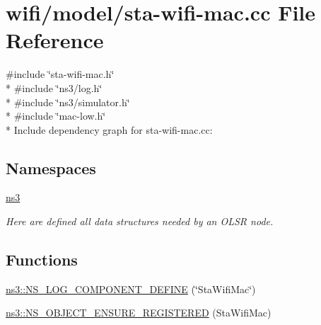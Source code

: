 \hypertarget{sta-wifi-mac_8cc}{}\section{wifi/model/sta-\/wifi-\/mac.cc File Reference}
\label{sta-wifi-mac_8cc}
{\ttfamily \#include \char`\"{}sta-\/wifi-\/mac.\+h\char`\"{}}\\*
{\ttfamily \#include \char`\"{}ns3/log.\+h\char`\"{}}\\*
{\ttfamily \#include \char`\"{}ns3/simulator.\+h\char`\"{}}\\*
{\ttfamily \#include \char`\"{}mac-\/low.\+h\char`\"{}}\\*
Include dependency graph for sta-\/wifi-\/mac.cc\+:
\subsection*{Namespaces}
\begin{DoxyCompactItemize}
\item 
 \hyperlink{namespacens3}{ns3}
\begin{DoxyCompactList}\small\item\em Here are defined all data structures needed by an O\+L\+SR node. \end{DoxyCompactList}\end{DoxyCompactItemize}
\subsection*{Functions}
\begin{DoxyCompactItemize}
\item 
\hyperlink{namespacens3_a395cfa6d9eb222df226e2ceea76418bd}{ns3\+::\+N\+S\+\_\+\+L\+O\+G\+\_\+\+C\+O\+M\+P\+O\+N\+E\+N\+T\+\_\+\+D\+E\+F\+I\+NE} (\char`\"{}Sta\+Wifi\+Mac\char`\"{})
\item 
\hyperlink{namespacens3_ac9b82f5e7e9e909afe93289fd667ea84}{ns3\+::\+N\+S\+\_\+\+O\+B\+J\+E\+C\+T\+\_\+\+E\+N\+S\+U\+R\+E\+\_\+\+R\+E\+G\+I\+S\+T\+E\+R\+ED} (Sta\+Wifi\+Mac)
\end{DoxyCompactItemize}
